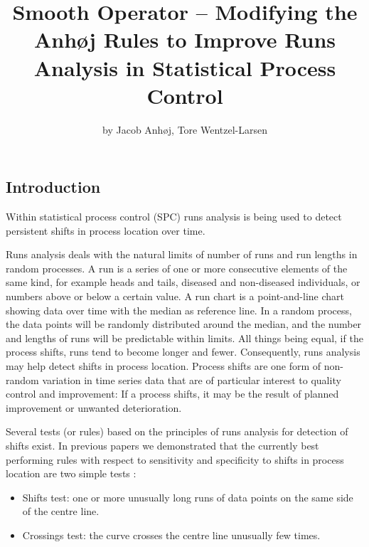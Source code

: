 \title{Smooth Operator -- Modifying the Anhøj Rules to Improve Runs Analysis in
Statistical Process Control}
\author{by Jacob Anhøj, Tore Wentzel-Larsen}

\maketitle



\hypertarget{introduction}{%
\subsection{Introduction}\label{introduction}}

Within statistical process control (SPC) runs analysis is being used to
detect persistent shifts in process location over time.

Runs analysis deals with the natural limits of number of runs and run
lengths in random processes. A run is a series of one or more
consecutive elements of the same kind, for example heads and tails,
diseased and non-diseased individuals, or numbers above or below a
certain value. A run chart is a point-and-line chart showing data over
time with the median as reference line. In a random process, the data
points will be randomly distributed around the median, and the number
and lengths of runs will be predictable within limits. All things being
equal, if the process shifts, runs tend to become longer and fewer.
Consequently, runs analysis may help detect shifts in process location.
Process shifts are one form of non-random variation in time series data
that are of particular interest to quality control and improvement: If a
process shifts, it may be the result of planned improvement or unwanted
deterioration.

Several tests (or rules) based on the principles of runs analysis for
detection of shifts exist. In previous papers we demonstrated that the
currently best performing rules with respect to sensitivity and
specificity to shifts in process location are two simple tests
\citep{anhoej2014, anhoej2015, anhoej2018}:

\begin{itemize}
\item
  Shifts test: one or more unusually long runs of data points on the
  same side of the centre line.
\item
  Crossings test: the curve crosses the centre line unusually few times.
\end{itemize}

